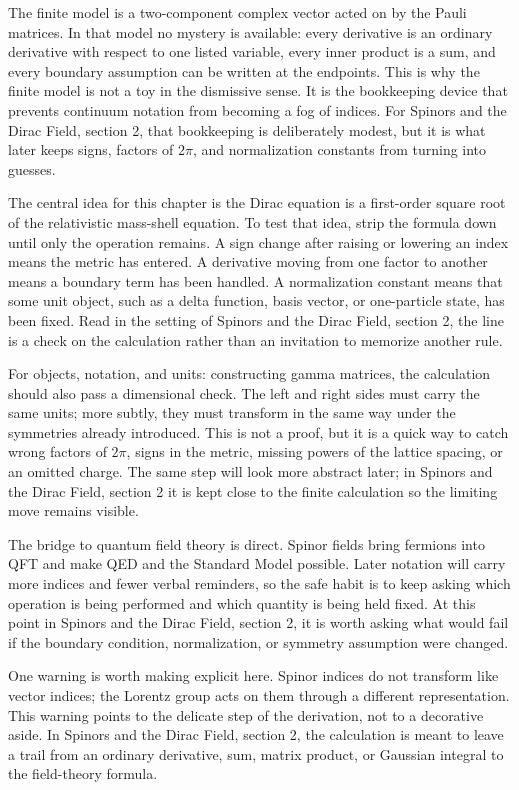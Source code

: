 The finite model is a two-component complex vector acted on by the Pauli matrices.  In that model no mystery is available: every derivative is an ordinary derivative with respect to one listed variable, every inner product is a sum, and every boundary assumption can be written at the endpoints.  This is why the finite model is not a toy in the dismissive sense.  It is the bookkeeping device that prevents continuum notation from becoming a fog of indices.  For Spinors and the Dirac Field, section 2, that bookkeeping is deliberately modest, but it is what later keeps signs, factors of \(2\pi\), and normalization constants from turning into guesses.

The central idea for this chapter is the Dirac equation is a first-order square root of the relativistic mass-shell equation.  To test that idea, strip the formula down until only the operation remains.  A sign change after raising or lowering an index means the metric has entered.  A derivative moving from one factor to another means a boundary term has been handled.  A normalization constant means that some unit object, such as a delta function, basis vector, or one-particle state, has been fixed.  Read in the setting of Spinors and the Dirac Field, section 2, the line is a check on the calculation rather than an invitation to memorize another rule.

For objects, notation, and units: constructing gamma matrices, the calculation should also pass a dimensional check.  The left and right sides must carry the same units; more subtly, they must transform in the same way under the symmetries already introduced.  This is not a proof, but it is a quick way to catch wrong factors of \(2\pi\), signs in the metric, missing powers of the lattice spacing, or an omitted charge.  The same step will look more abstract later; in Spinors and the Dirac Field, section 2 it is kept close to the finite calculation so the limiting move remains visible.

The bridge to quantum field theory is direct.  Spinor fields bring fermions into QFT and make QED and the Standard Model possible.  Later notation will carry more indices and fewer verbal reminders, so the safe habit is to keep asking which operation is being performed and which quantity is being held fixed.  At this point in Spinors and the Dirac Field, section 2, it is worth asking what would fail if the boundary condition, normalization, or symmetry assumption were changed.

One warning is worth making explicit here.  Spinor indices do not transform like vector indices; the Lorentz group acts on them through a different representation.  This warning points to the delicate step of the derivation, not to a decorative aside.  In Spinors and the Dirac Field, section 2, the calculation is meant to leave a trail from an ordinary derivative, sum, matrix product, or Gaussian integral to the field-theory formula.

